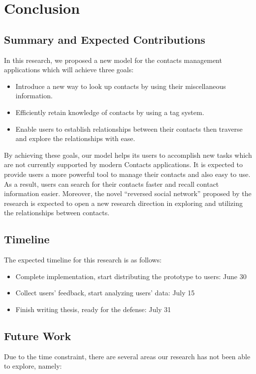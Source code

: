 \chapter{Conclusion}
\section{Summary and Expected Contributions}
In this research, we proposed a new model for the contacts management applications which will achieve three goals:
\begin{itemize}
    \item {Introduce a new way to look up contacts by using their miscellaneous information.}
    \item {Efficiently retain knowledge of contacts by using a tag system.} 
    \item {Enable users to establish relationships between their contacts then traverse and explore the relationships with ease.}
\end{itemize}

By achieving these goals, our model helps its users to accomplish new tasks which are not currently supported by modern Contacts applications. It is expected to provide users a more powerful tool to manage their contacts and also easy to use. As a result, users can search for their contacts faster and recall contact information easier. Moreover, the novel ``reversed social network'' proposed by the research is expected to open a new research direction in exploring and utilizing the relationships between contacts.

\section{Timeline}
The expected timeline for this research is as follows:

\begin{itemize}
    \item {Complete implementation, start distributing the prototype to users: June 30}
    \item {Collect users' feedback, start analyzing users' data: July 15} 
    \item {Finish writing thesis, ready for the defense: July 31}
\end{itemize}

\section{Future Work}
Due to the time constraint, there are several areas our research has not been able to explore, namely:

